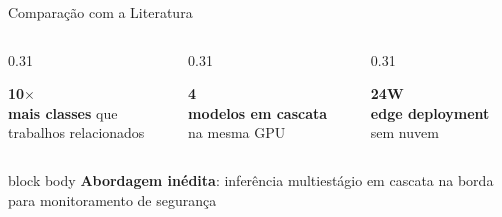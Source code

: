 \begin{frame}{Comparação com a Literatura}
  \begin{columns}[c]
    \begin{column}{0.31\textwidth}
      \centering
      \colorbox{headcolor!12}{%
        \parbox{0.9\textwidth}{\centering\vspace{1pt}
          {\fontsize{16}{18}\selectfont\textcolor{headcolor}{\textbf{10$\times$}}}\\[1pt]
          {\tiny\textbf{mais classes} que\\trabalhos relacionados}
        \vspace{1pt}}%
      }
    \end{column}
    \begin{column}{0.31\textwidth}
      \centering
      \colorbox{inputcolor!12}{%
        \parbox{0.9\textwidth}{\centering\vspace{1pt}
          {\fontsize{16}{18}\selectfont\textcolor{inputcolor}{\textbf{4}}}\\[1pt]
          {\tiny\textbf{modelos em cascata}\\na mesma GPU}
        \vspace{1pt}}%
      }
    \end{column}
    \begin{column}{0.31\textwidth}
      \centering
      \colorbox{outputcolor!12}{%
        \parbox{0.9\textwidth}{\centering\vspace{1pt}
          {\fontsize{16}{18}\selectfont\textcolor{outputcolor}{\textbf{24W}}}\\[1pt]
          {\tiny\textbf{edge deployment}\\sem nuvem}
        \vspace{1pt}}%
      }
    \end{column}
  \end{columns}

  \vspace{2mm}

  \begin{beamercolorbox}[wd=\textwidth, rounded=true, shadow=false]{block body}
    \centering
    {\footnotesize\color{stagecolor}%
      \textbf{Abordagem inédita}: inferência multiestágio em cascata na borda para monitoramento de segurança}
  \end{beamercolorbox}
\end{frame}

